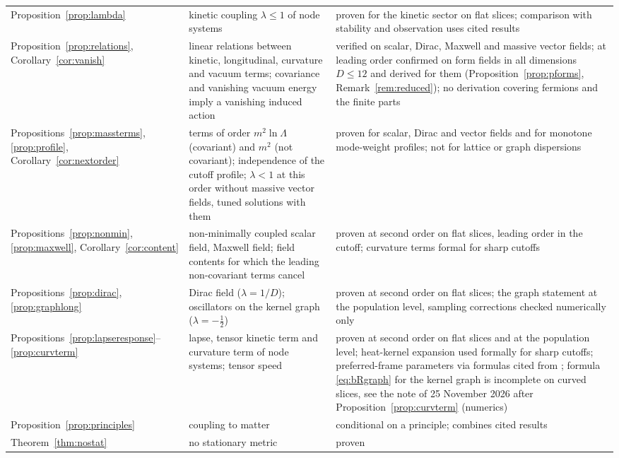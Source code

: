 \documentclass[11pt,a4paper]{article}
\theoremstyle{stmt}
\theoremstyle{defn}
\theoremstyle{rmk}
\numberwithin{equation}{section}
\begin{document}
{\begin{longtable}{@{}>{\raggedright\arraybackslash}p{}>{\raggedright\arraybackslash}p{}>{\raggedright\arraybackslash}p{}@{}}
Proposition~\ref{prop:lambda} & kinetic coupling $\lambda\le1$ of node systems & proven for the kinetic sector on flat slices; comparison with stability and observation uses cited results\\
Proposition~\ref{prop:relations}, Corollary~\ref{cor:vanish} & linear relations between kinetic, longitudinal, curvature and vacuum terms; covariance and vanishing vacuum energy imply a vanishing induced action & verified on scalar, Dirac, Maxwell and massive vector fields; at leading order confirmed on form fields in all dimensions $D\le12$ and derived for them (Proposition~\ref{prop:pforms}, Remark~\ref{rem:reduced}); no derivation covering fermions and the finite parts\\
Propositions~\ref{prop:massterms}, \ref{prop:profile}, Corollary~\ref{cor:nextorder} & terms of order $m^2\ln\Lambda$ (covariant) and $m^2$ (not covariant); independence of the cutoff profile; $\lambda<1$ at this order without massive vector fields, tuned solutions with them & proven for scalar, Dirac and vector fields and for monotone mode-weight profiles; not for lattice or graph dispersions\\
Propositions~\ref{prop:nonmin}, \ref{prop:maxwell}, Corollary~\ref{cor:content} & non-minimally coupled scalar field, Maxwell field; field contents for which the leading non-covariant terms cancel & proven at second order on flat slices, leading order in the cutoff; curvature terms formal for sharp cutoffs\\
Propositions~\ref{prop:dirac}, \ref{prop:graphlong} & Dirac field ($\lambda=1/D$); oscillators on the kernel graph ($\lambda=-\tfrac12$) & proven at second order on flat slices; the graph statement at the population level, sampling corrections checked numerically only\\
Propositions~\ref{prop:lapseresponse}--\ref{prop:curvterm} & lapse, tensor kinetic term and curvature term of node systems; tensor speed & proven at second order on flat slices and at the population level; heat-kernel expansion used formally for sharp cutoffs; preferred-frame parameters via formulas cited from \cite{GSS}; formula \eqref{eq:bRgraph} for the kernel graph is incomplete on curved slices, see the note of 25 November 2026 after Proposition~\ref{prop:curvterm} (numerics)\\
Proposition~\ref{prop:principles} & coupling to matter & conditional on a principle; combines cited results\\
Theorem~\ref{thm:nostat} & no stationary metric & proven\\

\end{longtable}}
\end{document}
